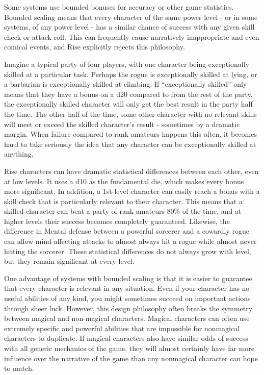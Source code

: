    Some systems use bounded bonuses for accuracy or other game statistics.
    Bounded scaling means that every character of the same power level - or in some systems, of any power level - has a similar chance of success with any given skill check or attack roll.
    This can frequently cause narratively inappropriate and even comical events, and Rise explicitly rejects this philosophy.

    Imagine a typical party of four players, with one character being exceptionally skilled at a particular task.
    Perhaps the rogue is exceptionally skilled at lying, or a barbarian is exceptionally skilled at climbing.
    If ``exceptionally skilled'' only means that they have a  bonus on a d20 compared to  from the rest of the party, the exceptionally skilled character will only get the best result in the party half the time.
    The other half of the time, some other character with no relevant skills will meet or exceed the skilled character's result - sometimes by a dramatic margin.
    When failure compared to rank amateurs happens this often, it becomes hard to take seriously the idea that any character can be exceptionally skilled at anything.

    Rise characters can have dramatic statistical differences between each other, even at low levels.
    It uses a d10 as the fundamental die, which makes every bonus more significant.
    In addition, a 1st-level character can easily reach a  bonus with a skill check that is particularly relevant to their character.
    This means that a skilled character can beat a party of rank amateurs 80\% of the time, and at higher levels their success becomes completely guaranteed.
    Likewise, the difference in Mental defense between a powerful sorcerer and a cowardly rogue can allow mind-affecting attacks to almost always hit a rogue while almost never hitting the sorcerer.
    These statistical differences do not always grow with level, but they remain significant at every level.

    One advantage of systems with bounded scaling is that it is easier to guarantee that every character is relevant in any situation.
    Even if your character has no useful abilities of any kind, you might sometimes succeed on important actions through sheer luck.
    However, this design philosophy often breaks the symmetry between magical and non-magical characters.
    Magical characters can often use extremely specific and powerful abilities that are impossible for nonmagical characters to duplicate.
    If magical characters also have similar odds of success with all generic mechanics of the game, they will almost certainly have far more influence over the narrative of the game than any nonmagical character can hope to match.

